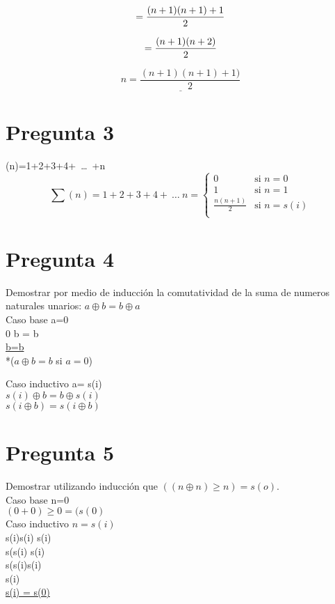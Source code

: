 \documentclass{article}
\begin{document}
\begin{equation}
=\frac{(n+1)(n+1)+1}{2}\\
\end{equation}

\begin{equation}
=\frac{(n+1)(n+2)}{2}\\
\end{equation}

\begin{equation}
\underline{n=\frac{(n+1)(n+1)+1)}{2}}    
\end{equation}





\section{Pregunta 3}
 \sum(n)=1+2+3+4+\ \ldots\ +n\\
\[
       \sum(n)=1+2+3+4+\ \ldots\ n=
                \left\{
                        \begin{array}{ll}
                                0  & \mbox{si } n = 0 \\
                                1 & \mbox{si } n = 1 \\
                                \frac{n(n+1)}{2} & \mbox{si } n = s(i) \\
                                
                                
                        \end{array}
                \right.
\]
 


\section{Pregunta 4}

Demostrar por medio de inducci\'on la comutatividad de la suma de
numeros naturales unarios: $a\oplus b = b\oplus a$\\
Caso base a=0\\
0 \oplus b = b \\
\underline{b=b} \\
*($a \oplus b = b$ si $a=0$)

Caso inductivo a= s(i)\\
$s(i)\oplus b = b\oplus s(i)$\\
\underline{$s(i\oplus b) = s(i \oplus b)$}\\










\section{Pregunta 5}

Demostrar utilizando inducci\'on que $((n\oplus n)\geq n) = s(o)$.\\
Caso base n=0\\
$(0+0)\geq0= (s(0) $\\
Caso inductivo $n=s(i)$\\
s(i)\oplus s(i) \geq s(i)  \\
s(s(i) \geq s(i)  \\
s(s(i)\ominus s(i)   \\
s(i)   \\
\underline{s(i) = s(0) } \\
\end{document}
